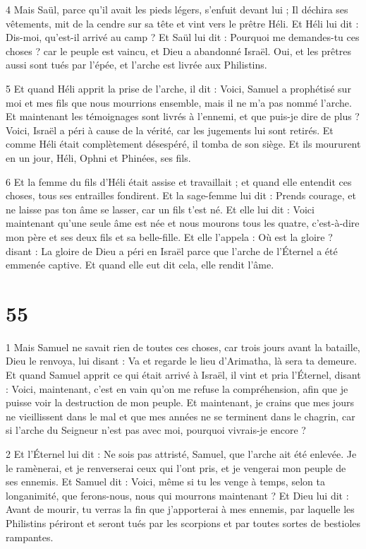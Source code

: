 \par 4 Mais Saül, parce qu'il avait les pieds légers, s'enfuit devant lui ; Il déchira ses vêtements, mit de la cendre sur sa tête et vint vers le prêtre Héli. Et Héli lui dit : Dis-moi, qu'est-il arrivé au camp ? Et Saül lui dit : Pourquoi me demandes-tu ces choses ? car le peuple est vaincu, et Dieu a abandonné Israël. Oui, et les prêtres aussi sont tués par l'épée, et l'arche est livrée aux Philistins.

\par 5 Et quand Héli apprit la prise de l'arche, il dit : Voici, Samuel a prophétisé sur moi et mes fils que nous mourrions ensemble, mais il ne m'a pas nommé l'arche. Et maintenant les témoignages sont livrés à l’ennemi, et que puis-je dire de plus ? Voici, Israël a péri à cause de la vérité, car les jugements lui sont retirés. Et comme Héli était complètement désespéré, il tomba de son siège. Et ils moururent en un jour, Héli, Ophni et Phinées, ses fils.

\par 6 Et la femme du fils d'Héli était assise et travaillait ; et quand elle entendit ces choses, tous ses entrailles fondirent. Et la sage-femme lui dit : Prends courage, et ne laisse pas ton âme se lasser, car un fils t'est né. Et elle lui dit : Voici maintenant qu'une seule âme est née et nous mourons tous les quatre, c'est-à-dire mon père et ses deux fils et sa belle-fille. Et elle l'appela : Où est la gloire ? disant : La gloire de Dieu a péri en Israël parce que l'arche de l'Éternel a été emmenée captive. Et quand elle eut dit cela, elle rendit l'âme.

\chapter{55}

\par 1 Mais Samuel ne savait rien de toutes ces choses, car trois jours avant la bataille, Dieu le renvoya, lui disant : Va et regarde le lieu d'Arimatha, là sera ta demeure. Et quand Samuel apprit ce qui était arrivé à Israël, il vint et pria l'Éternel, disant : Voici, maintenant, c'est en vain qu'on me refuse la compréhension, afin que je puisse voir la destruction de mon peuple. Et maintenant, je crains que mes jours ne vieillissent dans le mal et que mes années ne se terminent dans le chagrin, car si l'arche du Seigneur n'est pas avec moi, pourquoi vivrais-je encore ?

\par 2 Et l'Éternel lui dit : Ne sois pas attristé, Samuel, que l'arche ait été enlevée. Je le ramènerai, et je renverserai ceux qui l'ont pris, et je vengerai mon peuple de ses ennemis. Et Samuel dit : Voici, même si tu les venge à temps, selon ta longanimité, que ferons-nous, nous qui mourrons maintenant ? Et Dieu lui dit : Avant de mourir, tu verras la fin que j'apporterai à mes ennemis, par laquelle les Philistins périront et seront tués par les scorpions et par toutes sortes de bestioles rampantes.

